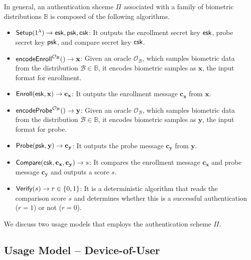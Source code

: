 In general, an authentication shceme $\Pi$ associated with a family of biometric distributions $\mathbb{B}$ is composed of the following algorithms.

\begin{itemize}

	\item ${\sf Setup}(1^\lambda) \to {\sf esk}, {\sf psk}, {\sf csk}$: It outputs the enrollment secret key ${\sf esk}$, probe secret key ${\sf psk}$, and compare secret key $\sf csk$.

	\item ${\sf encodeEnroll}^{\mathcal{O}_{\mathcal{B}}}() \to \mathbf{x}$: Given an oracle $\mathcal{O}_{\mathcal{B}}$, which samples biometric data from the distribution $\mathcal{B} \in \mathbb{B}$, it encodes biometric samples as $\mathbf{x}$, the input format for enrollment. 

	\item ${\sf Enroll}({\sf esk}, \mathbf{x}) \to \mathbf{c_x}$: It outputs the enrollment message $\mathbf{c_x}$ from $\mathbf{x}$.

	\item ${\sf encodeProbe}^{\mathcal{O}_{\mathcal{B}}}() \to \mathbf{y}$: Given an oracle $\mathcal{O}_{\mathcal{B}}$, which samples biometric data from the distribution $\mathcal{B} \in \mathbb{B}$, it encodes biometric samples as $\mathbf{y}$, the input format for probe.

	\item ${\sf Probe}({\sf psk}, \mathbf{y}) \to \mathbf{c_y}$: It outputs the probe message $\mathbf{c_y}$ from $\mathbf{y}$.

	\item ${\sf Compare}({\sf csk}, \mathbf{c_x}, \mathbf{c_y)} \to s$: It compares the enrollment message $\mathbf{c_x}$ and probe message $\mathbf{c_y}$ and outputs a score $s$.

	\item ${\sf Verify}(s) \to r \in \{0,1\}$: It is a deterministic algorithm that reads the comparison score $s$ and determines whether this is a successful authentication ($r = 1$) or not ($r = 0$).

\end{itemize}

\noindent 
We discuss two usage models that employs the authentication scheme $\Pi$.


\subsection{Usage Model – Device-of-User}
\label{sec:dou_model}

